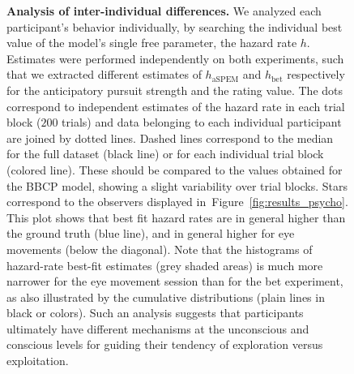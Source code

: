 \documentclass[10pt,letterpaper]{article}
\newcommand{\seeFig}[1]{Figure~\ref{fig:#1}}
\begin{document}
\begin{figure}
\caption{\textbf{Analysis of inter-individual differences.} %
We analyzed each participant's behavior individually, by searching
the individual best value of the model's single free parameter, the hazard rate $h$.
Estimates were performed independently on both experiments,
such that we extracted different estimates of $h_{\text{aSPEM}}$ and $h_{\text{bet}}$
respectively for the anticipatory pursuit strength and the rating value.
The dots correspond to independent estimates of the hazard rate
in each trial block ($200$ trials) and data belonging to
each individual participant are joined by dotted lines.
Dashed lines correspond to the median for the full dataset (black line)
or for each individual trial block (colored line).
These should be compared to the values obtained for the BBCP model,
showing a slight variability over trial blocks.
Stars correspond to the observers displayed in~\seeFig{results_psycho}.
This plot shows that best fit hazard rates are in general higher than the ground truth (blue line),
and in general higher for eye movements (below the diagonal).
Note that the histograms of hazard-rate best-fit estimates (grey shaded areas) is much more narrower
for the eye movement session than for the bet experiment,
as also illustrated by the cumulative distributions (plain lines in black or colors).
Such an analysis suggests that participants ultimately have
different mechanisms at the unconscious and conscious levels
for guiding their tendency of exploration versus exploitation.
}
\label{fig:results_inter}
\end{figure}
\end{document}
